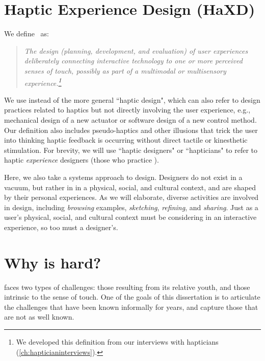 \section{Haptic Experience Design (HaXD)}
We define \haxd\ as: %
\begin{quote}
\it The design (planning, development, and evaluation) of user experiences  deliberately connecting interactive technology to
one or more perceived senses of touch, possibly as part of a multimodal or multisensory experience.\footnote{We developed this definition from our interviews with hapticians (\autoref{ch:hapticianinterviews}).}
\end{quote}
We use \haxd instead of the more general ``haptic design", which can also refer to design practices related to haptics but not directly involving the user experience, e.g., mechanical design of a new actuator or software design of a new control method.
Our definition also includes pseudo-haptics \cite{Pusch2011} and other illusions that trick the user into thinking haptic feedback is occurring without direct tactile or kinesthetic stimulation.
For brevity, we will use ``haptic designers" or ``hapticians" to refer to haptic \emph{experience} designers (those who practice \haxd).



Here, we also take a systems approach to design.
Designers do not exist in a vacuum, but rather in in a physical, social, and cultural context, and are shaped by their personal experiences.
As we will elaborate, diverse activities are involved in design, including \emph{browsing} examples, \emph{sketching}, \emph{refining}, and \emph{sharing}.
Just as a user's physical, social, and cultural context must be considering in an interactive experience, so too must a designer's.


\section{Why is \haxd hard?}
\haxd faces two types of challenges: those resulting from its relative youth, and those intrinsic to the sense of touch.
One of the goals of this dissertation is to articulate the challenges that have been known informally for years, and capture those that are not as well known.

